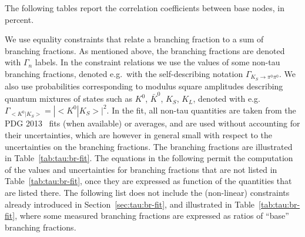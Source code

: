\label{sec:tau:fitcorr}

The following tables report the correlation coefficients between base nodes,
in percent.


\label{sec:tau:constraints}

We use equality constraints that relate a branching fraction to a sum of
branching fractions. As mentioned above, the \mtau branching fractions are
denoted with $\Gamma_n$ labels. In the constraint relations we use the
values of some non-tau branching fractions, denoted e.g.\ with the
self-describing notation $\Gamma_{K_S \to \pi^0\pi^0}$. We also use
probabilities corresponding to modulus square amplitudes describing quantum
mixtures of states such as $K^0$, $\bar{K}^0$, $K_S$, $K_L$, denoted with
e.g.\ $\Gamma_{<K^0|K_S>} = |{<}K^0|K_S{>}|^2$.
In the fit, all non-tau quantities are taken from the PDG 2013~\cite{PDG_2012}
fits (when available) or averages, and are used without accounting for their
uncertainties, which are however in general small with respect
to the uncertainties on the \mtau branching fractions.
The \mtau branching fractions are illustrated in Table~\ref{tab:tau:br-fit}.
The equations in the following permit the computation of the values and
uncertainties for branching fractions that are not listed in
Table~\ref{tab:tau:br-fit}, once they are expressed as function of the
quantities that are listed there. The following list does not include the
(non-linear) constraints already introduced in
Section~\ref{sec:tau:br-fit}, and illustrated in
Table~\ref{tab:tau:br-fit}, where some measured branching fractions are
expressed as ratios of ``base'' branching fractions.

\begin{envsmall}
  \setlength\abovedisplayskip{0pt}
  \setlength\belowdisplayshortskip{0pt}
  \ifhevea\renewcommand{\bar}[1]{\textoverline{#1}}\fi
\end{envsmall}

\label{sec:tau:lifetime}

